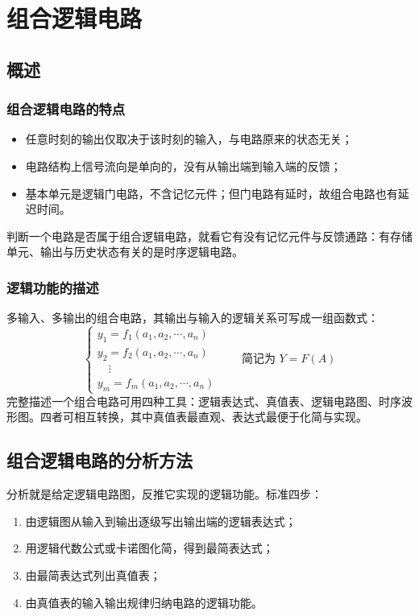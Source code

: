 
\chapter{组合逻辑电路}
\setlength{\parskip}{0.4em}
\setlength{\itemsep}{0.2em}
\setlength{\tabcolsep}{4pt} %

\section{概述}
\subsection{组合逻辑电路的特点}
\begin{itemize}
    \item 任意时刻的输出仅取决于该时刻的输入，与电路原来的状态无关；
    \item 电路结构上信号流向是单向的，没有从输出端到输入端的反馈；
    \item 基本单元是逻辑门电路，不含记忆元件；但门电路有延时，故组合电路也有延迟时间。
\end{itemize}
判断一个电路是否属于组合逻辑电路，就看它有没有记忆元件与反馈通路：有存储单元、输出与历史状态有关的是时序逻辑电路。

\subsection{逻辑功能的描述}
多输入、多输出的组合电路，其输出与输入的逻辑关系可写成一组函数式：
\[
\begin{cases}
y_1=f_1\left(a_1,a_2,\cdots,a_n\right)\\
y_2=f_2\left(a_1,a_2,\cdots,a_n\right)\\
\quad\vdots\\
y_m=f_m\left(a_1,a_2,\cdots,a_n\right)
\end{cases}
\qquad\text{简记为 } Y=F(A)
\]
完整描述一个组合电路可用四种工具：逻辑表达式、真值表、逻辑电路图、时序波形图。四者可相互转换，其中真值表最直观、表达式最便于化简与实现。

\section{组合逻辑电路的分析方法}
分析就是给定逻辑电路图，反推它实现的逻辑功能。标准四步：
\begin{enumerate}
    \item 由逻辑图从输入到输出逐级写出输出端的逻辑表达式；
    \item 用逻辑代数公式或卡诺图化简，得到最简表达式；
    \item 由最简表达式列出真值表；
    \item 由真值表的输入输出规律归纳电路的逻辑功能。
\end{enumerate}

